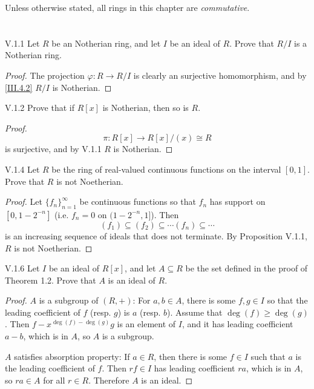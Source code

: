 Unless otherwise stated, all rings in this chapter are \emph{commutative}.

\section{}


\begin{problem}{V.1.1}
Let $R$ be an Notherian ring, and let $I$ be an ideal of $R$. Prove that $R/I$ is a Notherian ring.
\end{problem}
\begin{proof}
The projection $\varphi: R \to R/I$ is clearly an surjective homomorphism, and by \ref{III.4.2} $R/I$ is Notherian.
\end{proof}

\begin{problem}{V.1.2}
Prove that if $R[x]$ is Notherian, then so is $R$.
\end{problem}
\begin{proof}
\[
\pi: R[x] \to R[x]/(x) \cong R
\]
is surjective, and by V.1.1 $R$ is Notherian.
\end{proof}

\begin{problem}{V.1.4}
Let $R$ be the ring of real-valued continuous functions on the interval $[0,1]$. Prove that $R$ is not Noetherian.
\end{problem}
\begin{proof}
Let $\{f_n\}_{n = 1}^\infty$ be continuous functions so that $f_n$ has support on $[0,1-2^{-n}]$ (i.e. $f_n = 0$ on $(1-2^{-n},1]$). Then  
\[
(f_1) \subseteq (f_2) \subseteq \cdots (f_n) \subseteq \cdots	
\] 
is an increasing sequence of ideals that does not terminate. By Proposition V.1.1, $R$ is not Noetherian.
\end{proof}

\begin{problem}{V.1.6}
Let $I$ be an ideal of $R[x]$, and let $A \subseteq R$ be the set defined in the proof of Theorem 1.2. Prove that $A$ is an ideal of $R$.
\end{problem}
\begin{proof}
$A$ is a subgroup of $(R,+)$: For $a, b \in A$, there is some $f, g \in I$ so that the leading coefficient of $f$ (resp. $g$) is $a$ (resp. $b$). Assume that $\deg(f) \geq \deg(g)$. Then $f - x^{\deg(f)-\deg(g)}g$ is an element of $I$, and it has leading coefficient $a-b$, which is in $A$, so $A$ is a subgroup.

$A$ satisfies absorption property: If $a \in R$, then there is some $f \in I$ such that $a$ is the leading coefficient of $f$. Then $rf \in I$ has leading coefficient $ra$, which is in $A$, so $ra \in A$ for all $r \in R$. Therefore $A$ is an ideal.   
\end{proof}

